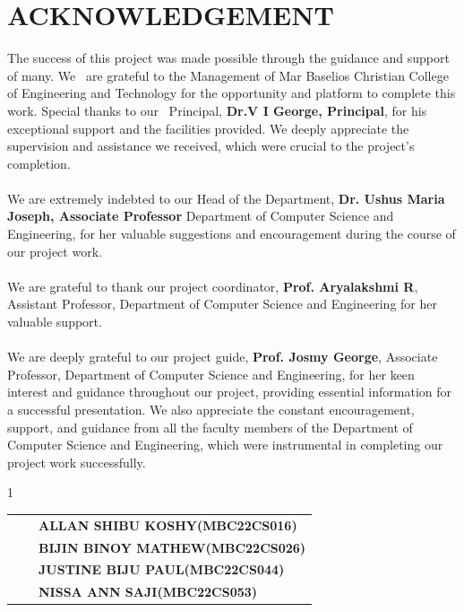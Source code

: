 \documentclass[a4paper,12pt]{report}
\begin{document}
\chapter*{ACKNOWLEDGEMENT}
\vspace{1cm}

\fontsize{12pt}{18pt}\selectfont


The success of this project was made possible through the guidance and support of many. We 
are grateful to the Management of Mar Baselios Christian College of Engineering and Technology for the opportunity and platform to complete this work. Special thanks to our 
Principal, \textbf{Dr.V I George, Principal}, for his exceptional support and the facilities provided. We deeply appreciate the supervision and assistance we received, which were crucial to the project's completion.  \\
\\
We are extremely indebted to our Head of the Department, \textbf{Dr. Ushus Maria Joseph, Associate Professor} Department of Computer Science and Engineering, for her valuable suggestions and encouragement during the course of our project work. \\
\\
We are grateful to thank our project coordinator, \textbf{Prof. Aryalakshmi R}, Assistant Professor, Department of Computer Science and Engineering for her valuable support. \\
\\
We are deeply grateful to our project guide, \textbf{Prof. Josmy George}, Associate Professor, Department of Computer Science and Engineering, for her keen interest and guidance throughout our project, providing essential information for a successful presentation. We also appreciate the constant encouragement, support, and guidance from all the faculty members of the Department of Computer Science and Engineering, which were instrumental in completing our project work successfully. \\
\vspace{1cm}

\begin{spacing}{1}
	
	\begin{table}[h!]
		\centering
		\begin{tabular}{p{0.5cm} p{6cm} p{10cm}}
\textbf{} && \textbf{ALLAN SHIBU KOSHY(MBC22CS016)} \\[0.3cm]
\textbf{} && \textbf{BIJIN BINOY MATHEW(MBC22CS026)} \\[0.3cm]
\textbf{} && \textbf{JUSTINE BIJU PAUL(MBC22CS044)} \\[0.3cm]
			\textbf{} && \textbf{NISSA ANN SAJI(MBC22CS053)} \\[0.3cm]
		\end{tabular}
	\end{table}
\end{spacing}
\newpage
\end{document}
